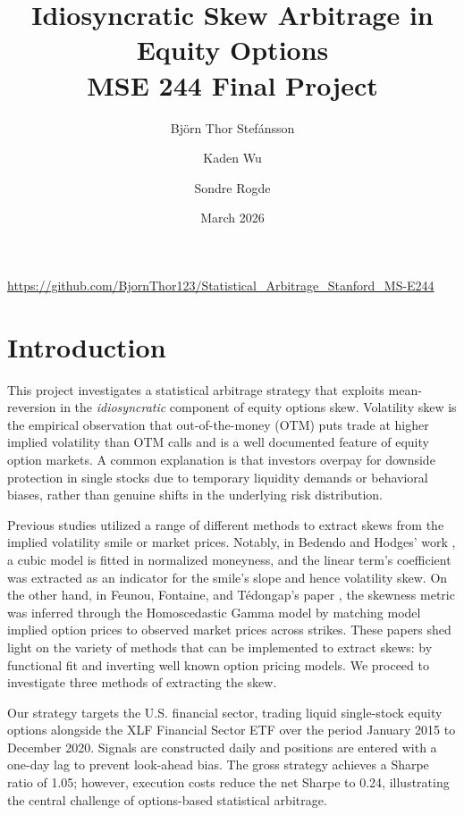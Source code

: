 \documentclass[12pt, a4paper]{article}
\title{\textbf{Idiosyncratic Skew Arbitrage in Equity Options}\\[0.5em]
\large MSE 244 Final Project}
\author{Björn Thor Stefánsson \and Kaden Wu \and Sondre Rogde \\ }
\date{March 2026}
\begin{document}
\maketitle
\tableofcontents
\url{https://github.com/BjornThor123/Statistical_Arbitrage_Stanford_MS-E244}
\newpage

\section{Introduction}

This project investigates a statistical arbitrage strategy that exploits mean-reversion in the \emph{idiosyncratic} component of equity options skew. Volatility skew is the empirical observation that out-of-the-money (OTM) puts trade at higher implied volatility than OTM calls and is a well documented feature of equity option markets. A common explanation is that investors overpay for downside protection in single stocks due to temporary liquidity demands or behavioral biases, rather than genuine shifts in the underlying risk distribution.

Previous studies utilized a range of different methods to extract skews from the implied volatility smile or market prices. Notably, in Bedendo and Hodges' work \cite{kalman_filter}, a cubic model is fitted in normalized moneyness, and the linear term's coefficient was extracted as an indicator for the smile's slope and hence volatility skew. On the other hand, in Feunou, Fontaine, and Tédongap's paper \cite{skewness_surface}, the skewness metric was inferred through the Homoscedastic Gamma model by matching model implied option prices to observed market prices across strikes. These papers shed light on the variety of methods that can be implemented to extract skews: by functional fit and inverting well known option pricing models. We proceed to investigate three methods of extracting the skew.

Our strategy targets the U.S. financial sector, trading liquid single-stock equity options alongside the XLF Financial Sector ETF over the period January 2015 to December 2020. Signals are constructed daily and positions are entered with a one-day lag to prevent look-ahead bias. The gross strategy achieves a Sharpe ratio of 1.05; however, execution costs reduce the net Sharpe to 0.24, illustrating the central challenge of options-based statistical arbitrage.
\end{document}
